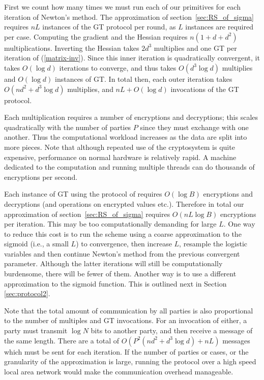 \documentclass[11pt]{article}
\begin{document}
First we count how many times we must run each of our primitives for each iteration of Newton's method.  The approximation of section~\ref{sec:RS_of_sigma} requires $nL$ instances of the GT protocol per round, as $L$ instances are required per case.  Computing the gradient and the Hessian requires $n(1+d+d^2)$ multiplications.
Inverting the Hessian takes $2d^3$ multiplies and one GT per iteration of (\ref{matrix-inv}).  Since this inner iteration is quadratically convergent, it takes $O(\log{d})$ iterations to converge, and thus takes $O(d^3\log{d})$ multiplies and $O(\log{d})$ instances of GT. In total then, each outer iteration takes $O(nd^2+d^3\log{d})$ multiplies, and $nL+O(\log{d})$ invocations of the GT protocol.

Each multiplication requires a number of encryptions and decryptions;  this scales quadratically with the number of parties $P$ since they must exchange with one another.  Thus the computational workload increases as the data are split into more pieces.  Note that although repeated use of the cryptosystem is quite expensive, performance  on normal hardware is relatively rapid.  A machine  dedicated to the computation and running multiple threads can do thousands of encryptions per  second.

Each instance of GT using the protocol of \cite{gt_proto} requires $O(\log{B})$ encryptions and decryptions (and operations on encrypted values etc.).  Therefore in total our approximation of section~\ref{sec:RS_of_sigma} requires $O(nL\log{B})$ encryptions per iteration.  This may be too computationally demanding for large $L$.  One way to reduce this cost is to run the scheme using a coarse approximation to the sigmoid (i.e., a small $L$) to convergence, then increase $L$, resample the logistic variables and then continue Newton's method from the previous convergent parameter.  Although the latter iterations will still be computationally burdensome, there will be fewer of them. Another way is to use a different approximation to the sigmoid function. This is outlined next in Section \ref{sec:protocol2}.

Note that the total amount of communication by all parties is also proportional to the number of multiples and GT invocations.  For an invocation of either, a party must transmit $\log{N}$ bits to another party, and then receive a message of the same length. There are a total of $O(P^2(nd^2+d^3\log{d})+nL)$ messages which must be sent for each iteration.  If  the number of parties or cases, or the granularity of the approximation is large,   running the protocol over a high speed local area network would make the communication overhead manageable.
\end{document}
